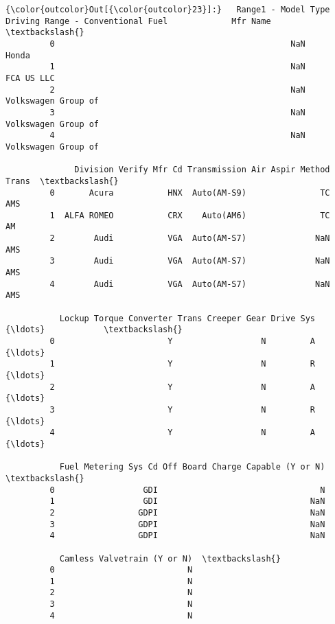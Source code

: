 \documentclass[11pt]{article}
\begin{document}
            \begin{Verbatim}[commandchars=\\\{\}]
{\color{outcolor}Out[{\color{outcolor}23}]:}   Range1 - Model Type Driving Range - Conventional Fuel             Mfr Name  \textbackslash{}
         0                                                NaN                   Honda   
         1                                                NaN              FCA US LLC   
         2                                                NaN     Volkswagen Group of   
         3                                                NaN     Volkswagen Group of   
         4                                                NaN     Volkswagen Group of   
         
              Division Verify Mfr Cd Transmission Air Aspir Method Trans  \textbackslash{}
         0       Acura           HNX  Auto(AM-S9)               TC   AMS   
         1  ALFA ROMEO           CRX    Auto(AM6)               TC    AM   
         2        Audi           VGA  Auto(AM-S7)              NaN   AMS   
         3        Audi           VGA  Auto(AM-S7)              NaN   AMS   
         4        Audi           VGA  Auto(AM-S7)              NaN   AMS   
         
           Lockup Torque Converter Trans Creeper Gear Drive Sys          {\ldots}            \textbackslash{}
         0                       Y                  N         A          {\ldots}             
         1                       Y                  N         R          {\ldots}             
         2                       Y                  N         A          {\ldots}             
         3                       Y                  N         R          {\ldots}             
         4                       Y                  N         A          {\ldots}             
         
           Fuel Metering Sys Cd Off Board Charge Capable (Y or N)  \textbackslash{}
         0                  GDI                                 N   
         1                  GDI                               NaN   
         2                 GDPI                               NaN   
         3                 GDPI                               NaN   
         4                 GDPI                               NaN   
         
           Camless Valvetrain (Y or N)  \textbackslash{}
         0                           N   
         1                           N   
         2                           N   
         3                           N   
         4                           N   
         

\end{Verbatim}
\end{document}
